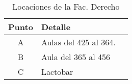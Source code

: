 \begin{table}[H]
  \begin{center}
    \begin{tabularx}{\textwidth}{ c  X  C{2.3cm} }
      \toprule
        \textbf{Punto} &
        \textbf{Detalle}\\

      \midrule
        A
        &
        Aulas del 425 al 364.
        \\

      \addlinespace
        B
        &
        Aula del 365 al 456 \\

      \addlinespace
        C
        &
        Lactobar \\


      \bottomrule
    \end{tabularx}
    \caption{Locaciones de la Fac. Derecho}
    \label{tab:lugares_derecho}
  \end{center}
\end{table}
